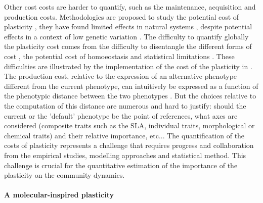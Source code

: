  Other cost costs are harder to quantify, such as the maintenance, acquisition and production costs. Methodologies are proposed to study the potential cost of plasticity \parencite{dewitt_costs_1998, valladares_quantitative_2006}, they have found limited effects in natural systems \parencite{van_kleunen_constraints_2005}, despite potential effects in a context of low genetic variation \parencite{dechaine_constraints_2007}. The difficulty to quantify globally the plasticity cost comes from the difficulty to disentangle the different forms of cost \parencite{murren_constraints_2015}, the potential cost of homoeostasis \parencite{van_kleunen_progress_2007}  and statistical limitations \parencite{auld_measuring_2011}. These difficulties are illustrated by the implementation of the cost of the plasticity in \model . The production cost, relative to the expression of an alternative phenotype different from the current phenotype, can intuitively be expressed as a function of the phenotypic distance between the two phenotypes \cite{valladares_quantitative_2006}. But the choices relative to the computation of this distance are numerous and hard to justify: should the current or the 'default' phenotype be the point of references, what axes are considered (composite traits such as the  SLA, individual traits, morphological or chemical traits) and their relative importance, etc...
The quantification of the costs of plasticity represents a challenge that requires progress and collaboration from the empirical studies, modelling approaches and statistical method. This challenge is crucial for the quantitative estimation of the importance of the plasticity on the community dynamics.
%
%
%
%
%

\paragraph{A molecular-inspired plasticity}

